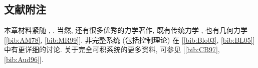 \subsection{文献附注}\label{subsec:geometric-mechanics-literature}

本章材料紧随 , . 当然, 还有很多优秀的力学著作, 既有传统力学 , 也有几何力学 [\ref{bib:AM78}, \ref{bib:MR99}]. 非完整系统 (包括控制理论) 在 [\ref{bib:Blo03}, \ref{bib:BL05}] 中有更详细的讨论. 关于完全可积系统的更多资料, 可参见 [\ref{bib:CB97}, \ref{bib:Aud96}].
